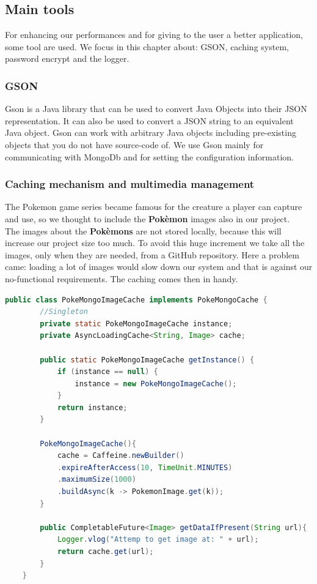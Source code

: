 
\subsection{Main tools}
For enhancing our performances and for giving to the user a better application, some tool are used. We focus in this chapter about: GSON, caching system, password encrypt and the logger.
\subsubsection{GSON}
Gson is a Java library that can be used to convert Java Objects into their JSON representation. It can also be used to convert a JSON string to an equivalent Java object. Gson can work with arbitrary Java objects including pre-existing objects that you do not have source-code of.
We use Gson mainly for communicating with MongoDb and for setting the configuration information.
\subsubsection{Caching mechanism and multimedia management}
The Pokemon game series became famous for the creature a player can capture and use, so we thought to include the \textbf{Pokèmon} images also in our project.\\
The images about the \textbf{Pokèmons} are not stored locally, because this will increase our project size too much. To avoid this huge increment we take all the images, only when they are needed, from a GitHub repository. Here a problem came: loading a lot of images would slow down our system and that is against our no-functional requirements. The caching comes then in handy.

\begin{lstlisting}[language=Java]
	public class PokeMongoImageCache implements PokeMongoCache {
		//Singleton
		private static PokeMongoImageCache instance;
		private AsyncLoadingCache<String, Image> cache;
		
		public static PokeMongoImageCache getInstance() {
			if (instance == null) {
				instance = new PokeMongoImageCache();
			}
			return instance;
		}
		
		PokeMongoImageCache(){
			cache = Caffeine.newBuilder()
			.expireAfterAccess(10, TimeUnit.MINUTES) 
			.maximumSize(1000) 
			.buildAsync(k -> PokemonImage.get(k));
		}
		
		public CompletableFuture<Image> getDataIfPresent(String url){
			Logger.vlog("Attemp to get image at: " + url);
			return cache.get(url);
		}
	}
\end{lstlisting}


